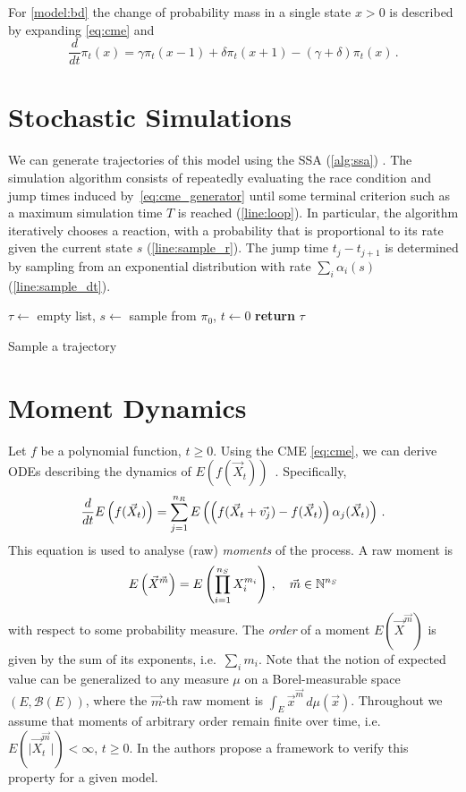 For \autoref{model:bd} the change of probability mass in a single state $x>0$ is described by expanding
\eqref{eq:cme} and
$$\frac{d}{dt}\pi_t(x)=\gamma \pi_t(x-1) + \delta \pi_t(x+1) - (\gamma + \delta)\pi_t(x)\,.$$

\section{Stochastic Simulations}
We can generate trajectories of this model using the \acf{SSA} (\autoref{alg:ssa})  \cite{gillespie1977exact}.
The simulation algorithm consists of repeatedly evaluating the race condition and jump times induced by~\eqref{eq:cme_generator} until some terminal criterion such as a maximum simulation time $T$ is reached (\autoref{line:loop}).
In particular, the algorithm iteratively chooses a reaction, with a probability that is
proportional to its rate given the current state $s$ (\autoref{line:sample_r}).
The jump time $t_j- t_{j+1}$ is determined by sampling from an exponential distribution with rate $\sum_i\alpha_i(s)$ (\autoref{line:sample_dt}).
\begin{algorithm}
    $\tau \leftarrow$ empty list, $s\leftarrow$ sample from $\pi_0$, $t\leftarrow 0$\;
    \textbf{return} $\tau$\;
    \caption{\label{alg:ssa}Sample a trajectory}
\end{algorithm}


\section{Moment Dynamics}\label{sec:moments_bg}
Let $f$ be a polynomial function, $t\ge0$.
Using the \ac{CME} \eqref{eq:cme}, we can derive \acp{ODE}
describing the dynamics of $E(f(\vec{X}_t))$~\cite{engblom2006computing}.
Specifically,
\begin{equation}\label{eq:mom_ode}
    \frac{d}{dt}{E}\left(f(\vec X_t)\right) = \sum_{j=1}^{n_R}{E}\left(\left(f({\vec X_t +
    \vec{v_j}}) - f(\vec X_t)\right)\alpha_j(\vec X_t)\right)\,.
\end{equation}
This equation is used to analyse (raw) \emph{moments} of the process.
A raw moment is
$${E}\left(\vec X^{\vec m}\right)={E}\left(\prod_{i=1}^{n_S} X_i^{m_i}\right)\,,\quad \vec m\in {\mathbb{N}}^{n_S}$$
with respect to some probability measure.
The \emph{order} of a moment $E({\vec X}^{\vec m})$ is given by the sum of its exponents,
i.e.\ $\sum_i m_i$.
Note that the notion of  expected value can be generalized
to any measure $\mu$ on a Borel-measurable space
$(E, \mathcal{B}(E))$, where
 the $\vec{m}$-th raw moment is $\int_E {\vec x}^{\vec m}\,d\mu(\vec x)$.
Throughout we assume that moments of arbitrary order remain finite over time,
i.e.\ $E(\lvert \vec{X}^{\vec{m}}_t\rvert)<\infty$, $t\geq 0$.
In \citet{gupta2014scalable} the authors propose a framework to verify
this property for a given model.

